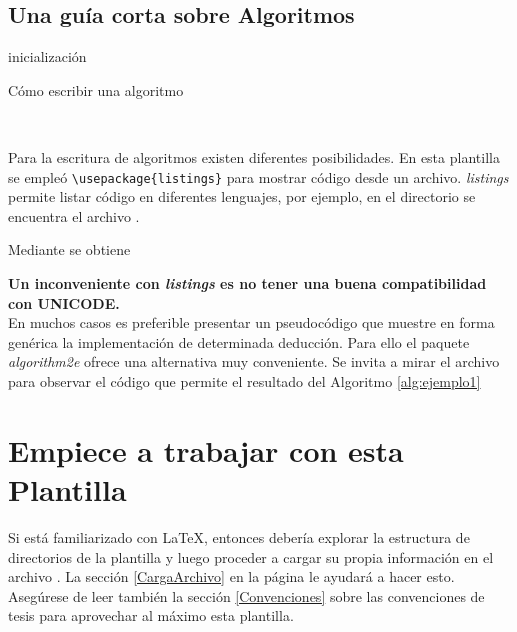	\subsection{Una guía corta sobre Algoritmos}
	
	
	\begin{algorithm}[H]
		\label{alg:ejemplo1}
		\SetAlgoLined
		inicialización\;
		\caption{Cómo escribir una algoritmo}
	\end{algorithm}
	\
	
	Para la escritura de algoritmos existen diferentes posibilidades. En esta plantilla se empleó \verb*|\usepackage{listings}| para mostrar código desde un archivo. \emph{listings} permite listar código en diferentes lenguajes, por ejemplo, en el directorio  se encuentra el archivo .
	
	Mediante \verb*|| se obtiene
	
	
	
	\textbf{Un inconveniente con \emph{listings} es no tener una buena compatibilidad con UNICODE.}
	\\
	
	En muchos casos es preferible presentar un pseudocódigo que muestre en forma genérica la implementación de determinada deducción. Para ello el paquete \emph{algorithm2e} ofrece una alternativa muy conveniente. Se invita a mirar el archivo  para observar el código que permite el resultado del Algoritmo \ref{alg:ejemplo1}
	
	
	

\section{Empiece a trabajar con esta Plantilla}

Si está familiarizado con \LaTeX{}, entonces debería explorar la estructura de directorios de la plantilla y luego proceder a cargar  su propia información en el archivo .  La sección \ref{CargaArchivo} en la página \pageref{CargaArchivo} le ayudará a hacer esto. Asegúrese de leer también la sección \ref{Convenciones} sobre las convenciones de tesis para aprovechar al máximo esta plantilla.

